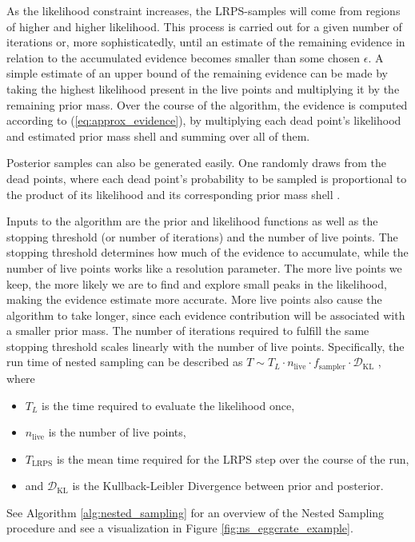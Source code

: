 \documentclass[12pt, a4paper]{report}
\begin{document}
As the likelihood constraint increases, the LRPS-samples will come from regions of higher and higher likelihood.
This process is carried out for a given number of iterations or, more sophisticatedly, until an estimate of the remaining evidence in relation to the accumulated evidence becomes smaller than some chosen $\epsilon$.
A simple estimate of an upper bound of the remaining evidence can be made by taking the highest likelihood present in the live points and multiplying it by the remaining prior mass.
Over the course of the algorithm, the evidence is computed according to (\ref{eq:approx_evidence}), by multiplying each dead point's likelihood and estimated prior mass shell and summing over all of them.

Posterior samples can also be generated easily.
One randomly draws from the dead points, where each dead point's probability to be sampled is proportional to the product of its likelihood and its corresponding prior mass shell \cite[9]{nested_sampling_talk}.

Inputs to the algorithm are the prior and likelihood functions as well as the stopping threshold (or number of iterations) and the number of live points.
The stopping threshold determines how much of the evidence to accumulate, while the number of live points works like a resolution parameter.
The more live points we keep, the more likely we are to find and explore small peaks in the likelihood, making the evidence estimate more accurate.
More live points also cause the algorithm to take longer, since each evidence contribution will be associated with a smaller prior mass.
The number of iterations required to fulfill the same stopping threshold scales linearly with the number of live points.
Specifically, the run time of nested sampling can be described as $T \sim T_L \cdot n_{\textrm{live}} \cdot f_{\textrm{sampler}} \cdot \mathcal{D}_{\textrm{KL}}$ \cite[1]{nested_sampling_talk}, where
\begin{itemize}
    \item $T_L$ is the time required to evaluate the likelihood once,
    \item $n_{\textrm{live}}$ is the number of live points,
    \item $T_{\textrm{LRPS}}$ is the mean time required for the LRPS step over the course of the run,
    \item and $\mathcal{D}_{\textrm{KL}}$ is the Kullback-Leibler Divergence \cite[6]{kld} between prior and posterior.
\end{itemize}
See Algorithm \ref{alg:nested_sampling} for an overview of the Nested Sampling procedure and see a visualization in Figure \ref{fig:ns_eggcrate_example}.
\end{document}

